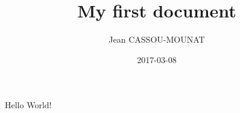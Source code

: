\documentclass{article}
\title{My first document}
\date{2017-03-08}
\author{Jean CASSOU-MOUNAT}
\begin{document}
  \maketitle
  \newpage

  Hello World!
\end{document}
